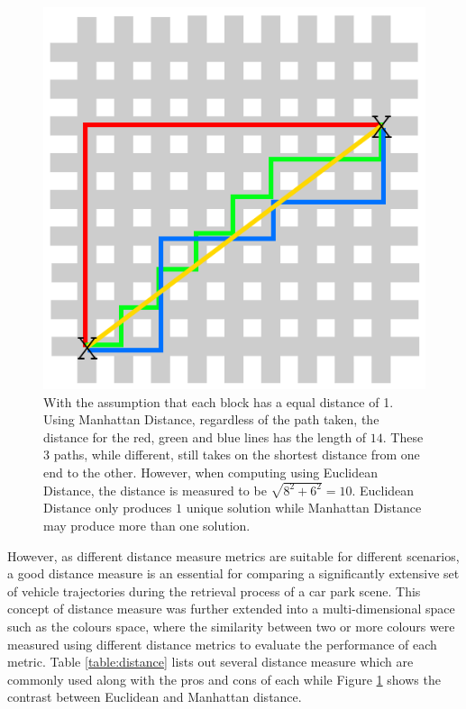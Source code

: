 \begin{figure}[hbt!]\centering
\includegraphics[width=.5\textwidth]{image/lit/manhattan.png}
\caption[Comparison between Manhattan Distance vs. Euclidean Distance]{With the assumption that each block has a equal distance of 1. Using Manhattan Distance, regardless of the path taken, the distance for the red, green and blue lines has the length of $14$. These 3 paths, while different, still takes on the shortest distance from one end to the other. However, when computing using Euclidean Distance, the distance is measured to be $\sqrt{8^2+6^2} = 10$. Euclidean Distance only produces $1$ unique solution while Manhattan Distance may produce more than one solution.}
\label{fig:manhattan}
\end{figure}


However, as different distance measure metrics are suitable for different scenarios, a good distance measure is an essential for comparing a significantly extensive set of vehicle trajectories during the retrieval process of a car park scene. This concept of distance measure was further extended into a multi-dimensional space such as the colours space, where the similarity between two or more colours were measured using different distance metrics to evaluate the performance of each metric. Table \ref{table:distance} lists out several distance measure which are commonly used along with the pros and cons of each while Figure \ref{fig:manhattan} shows the contrast between Euclidean and Manhattan distance.


